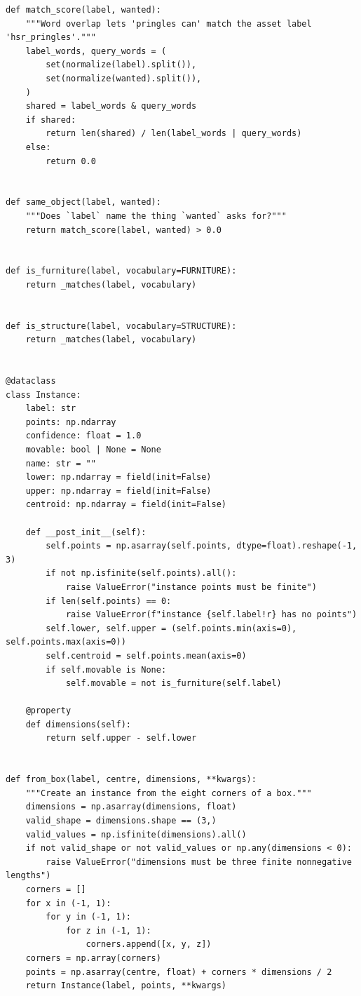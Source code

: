 \documentclass[11pt,a4paper]{book}
\begin{document}
\begin{lstlisting}
def match_score(label, wanted):
    """Word overlap lets 'pringles can' match the asset label 'hsr_pringles'."""
    label_words, query_words = (
        set(normalize(label).split()),
        set(normalize(wanted).split()),
    )
    shared = label_words & query_words
    if shared:
        return len(shared) / len(label_words | query_words)
    else:
        return 0.0


def same_object(label, wanted):
    """Does `label` name the thing `wanted` asks for?"""
    return match_score(label, wanted) > 0.0


def is_furniture(label, vocabulary=FURNITURE):
    return _matches(label, vocabulary)


def is_structure(label, vocabulary=STRUCTURE):
    return _matches(label, vocabulary)


@dataclass
class Instance:
    label: str
    points: np.ndarray
    confidence: float = 1.0
    movable: bool | None = None
    name: str = ""
    lower: np.ndarray = field(init=False)
    upper: np.ndarray = field(init=False)
    centroid: np.ndarray = field(init=False)

    def __post_init__(self):
        self.points = np.asarray(self.points, dtype=float).reshape(-1, 3)
        if not np.isfinite(self.points).all():
            raise ValueError("instance points must be finite")
        if len(self.points) == 0:
            raise ValueError(f"instance {self.label!r} has no points")
        self.lower, self.upper = (self.points.min(axis=0), self.points.max(axis=0))
        self.centroid = self.points.mean(axis=0)
        if self.movable is None:
            self.movable = not is_furniture(self.label)

    @property
    def dimensions(self):
        return self.upper - self.lower


def from_box(label, centre, dimensions, **kwargs):
    """Create an instance from the eight corners of a box."""
    dimensions = np.asarray(dimensions, float)
    valid_shape = dimensions.shape == (3,)
    valid_values = np.isfinite(dimensions).all()
    if not valid_shape or not valid_values or np.any(dimensions < 0):
        raise ValueError("dimensions must be three finite nonnegative lengths")
    corners = []
    for x in (-1, 1):
        for y in (-1, 1):
            for z in (-1, 1):
                corners.append([x, y, z])
    corners = np.array(corners)
    points = np.asarray(centre, float) + corners * dimensions / 2
    return Instance(label, points, **kwargs)
\end{lstlisting}
\end{document}
